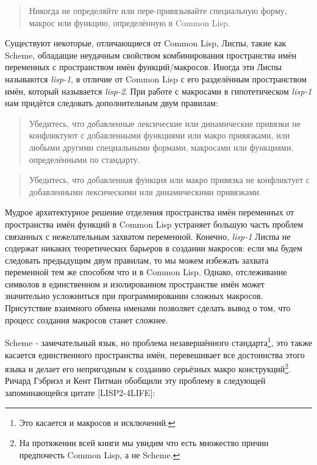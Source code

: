\begin{quote}
Никогда не определяйте или пере-привязывайте специальную форму, макрос или функцию, определённую в Common Lisp.
\end{quote}

Существуют некоторые, отличающиеся от Common Lisp, Лиспы, такие как {Scheme}, обладащие неудачным свойством комбинирования пространства имён переменных с пространством имён функций/макросов. Иногда эти Лиспы называются \emph{lisp-1}, в отличие от Common Lisp с его разделённым пространством имён, который называется \emph{lisp-2}. При работе с макросами в гипотетическом \emph{lisp-1} нам придётся следовать дополнительным двум правилам:

\begin{quote}
Убедитесь, что добавленные лексические или динамические привязки не конфликтуют с добавленными функциями или макро привязками, или любыми другими специальными формами, макросами или функциями, определёнными по стандарту.
\end{quote}

\begin{quote}
Убедитесь, что добавленная функция или макро привязка не конфликтует с добавленными лексическими или динамическими привязками.
\end{quote}

Мудрое архитектурное решение отделения пространства имён переменных от пространства имён функций в Common Lisp устраняет большую часть проблем связанных с нежелательным захватом переменной. Конечно, \emph{lisp-1} Лиспы не содержат никаких теоретических барьеров в создании макросов: если мы будем следовать предыдущим двум правилам, то мы можем избежать захвата переменной тем же способом что и в Common Lisp. Однако, отслеживание символов в единственном и изолированном пространстве имён может значительно усложниться при программировании сложных макросов. Присутствие взаимного обмена именами позволяет сделать вывод о том, что процесс создания макросов станет сложнее.

Scheme - замечательный язык, но проблема незавершённого стандарта\footnote{Это касается и макросов и исключений.}, это также касается единственного пространства имён, перевешивает все достоинства этого языка и делает его непригодным к созданию серьёзных макро конструкций\footnote{На протяжении всей книги мы увидим что есть множество причин предпочесть Common Lisp, а не Scheme.}. Ричард Гэбриэл и Кент Питман обобщили эту проблему в следующей запоминающейся цитате [LISP2-4LIFE]:

